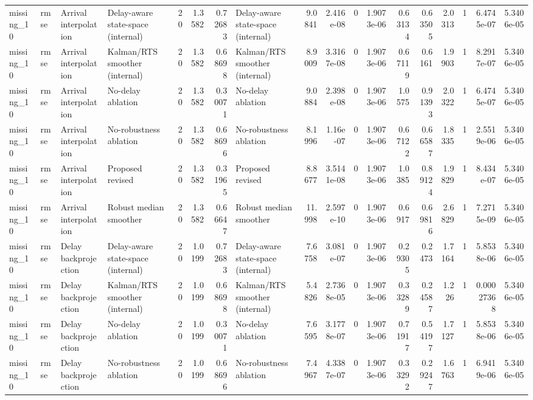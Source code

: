 \begin{table}[!htbp]
{\begin{tabular}{llllrrrlrrrrrrrrrr}
missing_10 & rmse & Arrival interpolation & Delay-aware state-space (internal) & 20 & 1.3582 & 0.72683 & Delay-aware state-space (internal) & 9.0841 & 2.416e-08 & 0 & 1.9073e-06 & 0.63134 & 0.63505 & 2.0313 & 1 & 6.4745e-07 & 5.3406e-05 \\
missing_10 & rmse & Arrival interpolation & Kalman/RTS smoother (internal) & 20 & 1.3582 & 0.68698 & Kalman/RTS smoother (internal) & 8.9009 & 3.3167e-08 & 0 & 1.9073e-06 & 0.67119 & 0.6161 & 1.9903 & 1 & 8.2917e-07 & 5.3406e-05 \\
missing_10 & rmse & Arrival interpolation & No-delay ablation & 20 & 1.3582 & 0.30071 & No-delay ablation & 9.0884 & 2.398e-08 & 0 & 1.9073e-06 & 1.0575 & 0.91393 & 2.0322 & 1 & 6.4745e-07 & 5.3406e-05 \\
missing_10 & rmse & Arrival interpolation & No-robustness ablation & 20 & 1.3582 & 0.68696 & No-robustness ablation & 8.1996 & 1.16e-07 & 0 & 1.9073e-06 & 0.67122 & 0.66587 & 1.8335 & 1 & 2.5519e-06 & 5.3406e-05 \\
missing_10 & rmse & Arrival interpolation & Proposed revised & 20 & 1.3582 & 0.31965 & Proposed revised & 8.8677 & 3.5141e-08 & 0 & 1.9073e-06 & 1.0385 & 0.89124 & 1.9829 & 1 & 8.434e-07 & 5.3406e-05 \\
missing_10 & rmse & Arrival interpolation & Robust median smoother & 20 & 1.3582 & 0.66647 & Robust median smoother & 11.998 & 2.597e-10 & 0 & 1.9073e-06 & 0.6917 & 0.69816 & 2.6829 & 1 & 7.2715e-09 & 5.3406e-05 \\
missing_10 & rmse & Delay backprojection & Delay-aware state-space (internal) & 20 & 1.0199 & 0.72683 & Delay-aware state-space (internal) & 7.6758 & 3.081e-07 & 0 & 1.9073e-06 & 0.29305 & 0.2473 & 1.7164 & 1 & 5.8538e-06 & 5.3406e-05 \\
missing_10 & rmse & Delay backprojection & Kalman/RTS smoother (internal) & 20 & 1.0199 & 0.68698 & Kalman/RTS smoother (internal) & 5.4826 & 2.7368e-05 & 0 & 1.9073e-06 & 0.33289 & 0.24587 & 1.226 & 1 & 0.00027368 & 5.3406e-05 \\
missing_10 & rmse & Delay backprojection & No-delay ablation & 20 & 1.0199 & 0.30071 & No-delay ablation & 7.6595 & 3.1778e-07 & 0 & 1.9073e-06 & 0.71917 & 0.54197 & 1.7127 & 1 & 5.8538e-06 & 5.3406e-05 \\
missing_10 & rmse & Delay backprojection & No-robustness ablation & 20 & 1.0199 & 0.68696 & No-robustness ablation & 7.4967 & 4.3387e-07 & 0 & 1.9073e-06 & 0.33292 & 0.29247 & 1.6763 & 1 & 6.9419e-06 & 5.3406e-05 \\

\end{tabular}}
\end{table}
